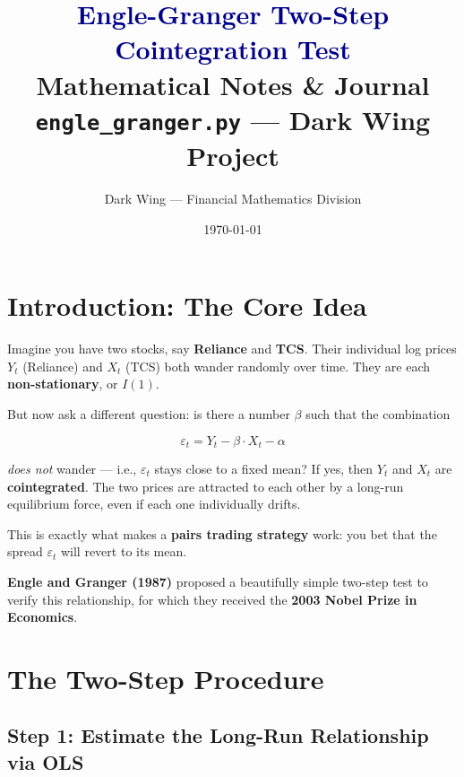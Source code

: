 \documentclass[12pt, a4paper]{article}
\title{
    \Huge\textbf{\textcolor{darkblue}{Engle-Granger Two-Step}} \\
    \Huge\textbf{\textcolor{darkblue}{Cointegration Test}} \\[0.5em]
    \Large Mathematical Notes \& Journal \\[0.5em]
    \large \texttt{engle\_granger.py} — Dark Wing Project
}
\author{Dark Wing — Financial Mathematics Division}
\date{\today}
\begin{document}
\maketitle
\tableofcontents
\newpage

\section{Introduction: The Core Idea}

Imagine you have two stocks, say \textbf{Reliance} and \textbf{TCS}. 
Their individual log prices $Y_t$ (Reliance) and $X_t$ (TCS) both wander randomly over time.
They are each \textbf{non-stationary}, or $I(1)$.

\medskip
But now ask a different question: is there a number $\beta$ such that the combination

\begin{equation}
    \varepsilon_t = Y_t - \beta \cdot X_t - \alpha
    \label{eq:spread}
\end{equation}

\emph{does not} wander — i.e., $\varepsilon_t$ stays close to a fixed mean? 
If yes, then $Y_t$ and $X_t$ are \textbf{cointegrated}. 
The two prices are attracted to each other by a long-run equilibrium force, 
even if each one individually drifts.

\medskip
This is exactly what makes a \textbf{pairs trading strategy} work: 
you bet that the spread $\varepsilon_t$ will revert to its mean.

\medskip
\textbf{Engle and Granger (1987)} proposed a beautifully simple two-step test to verify 
this relationship, for which they received the \textbf{2003 Nobel Prize in Economics}.

\section{The Two-Step Procedure}

\subsection{Step 1: Estimate the Long-Run Relationship via OLS}
\end{document}
